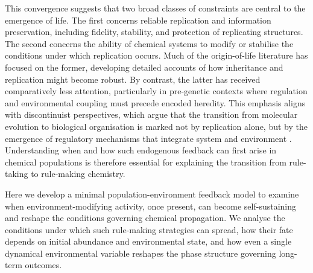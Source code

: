 This convergence suggests that two broad classes of constraints are central to the emergence of life. The first concerns reliable replication and information preservation, including fidelity, stability, and protection of replicating structures. The second concerns the ability of chemical systems to modify or stabilise the conditions under which replication occurs. Much of the origin-of-life literature has focused on the former, developing detailed accounts of how inheritance and replication might become robust. By contrast, the latter has received comparatively less attention, particularly in pre-genetic contexts where regulation and environmental coupling must precede encoded heredity. This emphasis aligns with discontinuist perspectives, which argue that the transition from molecular evolution to biological organisation is marked not by replication alone, but by the emergence of regulatory mechanisms that integrate system and environment \cite{BichDamiano2012Emergence}. Understanding when and how such endogenous feedback can first arise in chemical populations is therefore essential for explaining the transition from rule-taking to rule-making chemistry.

Here we develop a minimal population-environment feedback model to examine when environment-modifying activity, once present, can become self-sustaining and reshape the conditions governing chemical propagation. We analyse the conditions under which such rule-making strategies can spread, how their fate depends on initial abundance and environmental state, and how even a single dynamical environmental variable reshapes the phase structure governing long-term outcomes.
